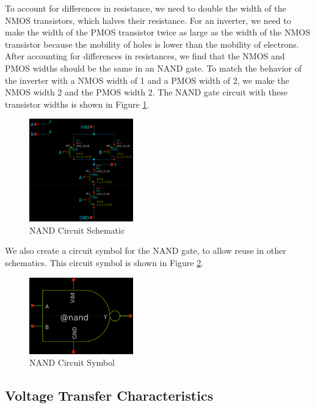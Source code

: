 \documentclass[fleqn]{article}
\begin{document}
	To account for differences in resistance, we need to double the width of the NMOS transistors, which halves their resistance. For an inverter, we need to make the width of the PMOS transistor twice as large as the width of the NMOS transistor because the mobility of holes is lower than the mobility of electrons. After accounting for differences in resistances, we find that the NMOS and PMOS widths should be the same in an NAND gate. To match the behavior of the inverter with a NMOS width of 1 and a PMOS width of 2, we make the NMOS width 2 and the PMOS width 2. The NAND gate circuit with these transistor widths is shown in Figure \ref{fig::nand_schematic}.
	
	\begin{figure}[H]
		\centerline{\includegraphics[width=0.4\textwidth]{nand_schematic.png}}
		\caption{NAND Circuit Schematic}
		\label{fig::nand_schematic}
	\end{figure}

	\noindent We also create a circuit symbol for the NAND gate, to allow reuse in other schematics. This circuit symbol is shown in Figure \ref{fig::nand_symbol}.
	
	\begin{figure}[H]
		\centerline{\includegraphics[width=0.4\textwidth]{nand_symbol.png}}
		\caption{NAND Circuit Symbol}
		\label{fig::nand_symbol}
	\end{figure}
	
	\subsection{Voltage Transfer Characteristics}
	
\end{document}
